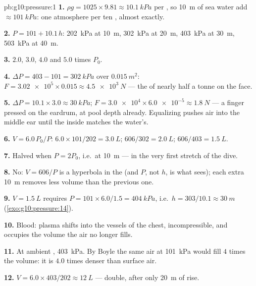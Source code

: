 \begin{solution}{pb:g10:pressure:1}
\textbf{1.} $\rho g = 1025 \times 9.81 \approx \qty{10.1}{kPa}$ per
, so \qty{10}{m} of sea water add $\approx \qty{101}{kPa}$: one
atmosphere per ten , almost exactly.

\textbf{2.} $P = 101 + 10.1\,h$: \qty{202}{kPa} at \qty{10}{m},
\qty{302}{kPa} at \qty{20}{m}, \qty{403}{kPa} at \qty{30}{m},
\qty{503}{kPa} at \qty{40}{m}.

\textbf{3.} $2.0$, $3.0$, $4.0$ and $5.0$ times $P_0$.

\textbf{4.} $\Delta P = 403 - 101 = \qty{302}{kPa}$ over
$\qty{0.015}{m^2}$: $F = \num{3.02e5} \times 0.015 \approx
\qty{4.5e3}{N}$ --- the  of nearly half a tonne on the face.

\textbf{5.} $\Delta P = 10.1 \times 3.0 \approx \qty{30}{kPa}$;
$F = \num{3.0e4} \times \num{6.0e-5} \approx \qty{1.8}{N}$ --- a
finger pressed on the eardrum, at pool depth already. Equalizing pushes
air into the middle ear until the inside  matches the water's.

\textbf{6.} $V = 6.0 \, P_0/P$: $6.0 \times 101/202 = \qty{3.0}{L}$;
$606/302 = \qty{2.0}{L}$; $606/403 = \qty{1.5}{L}$.

\textbf{7.} Halved when $P = 2P_0$, i.e.\ at \qty{10}{m} --- in the
very first stretch of the dive.

\textbf{8.} No: $V = 606/P$ is a hyperbola in the 
(and $P$, not $h$, is what  sees); each extra
\qty{10}{m} removes less volume than the previous one.

\textbf{9.} $V = \qty{1.5}{L}$ requires
$P = 101 \times 6.0/1.5 = \qty{404}{kPa}$, i.e.\
$h = 303/10.1 \approx \qty{30}{m}$ (\cref{exo:g10:pressure:14}).

\textbf{10.} Blood: plasma shifts into the vessels of the chest,
incompressible, and occupies the volume the air no longer fills.

\textbf{11.} At ambient , \qty{403}{kPa}. By Boyle the same
air at \qty{101}{kPa} would fill $4$ times the volume: it is $4.0$
times denser than surface air.

\textbf{12.} $V = 6.0 \times 403/202 \approx \qty{12}{L}$ --- double,
after only \qty{20}{m} of rise.


\end{solution}
